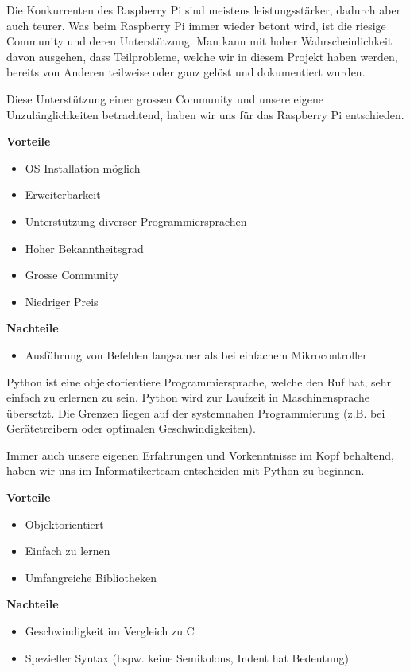 \documentclass[a4paper]{report}
\begin{document}
Die Konkurrenten des Raspberry Pi sind meistens leistungsstärker, dadurch aber auch teurer. Was beim Raspberry Pi immer wieder betont wird, ist die riesige Community und deren Unterstützung. Man kann mit hoher Wahrscheinlichkeit davon ausgehen, dass Teilprobleme, welche wir in diesem Projekt haben werden, bereits von Anderen teilweise oder ganz gelöst und dokumentiert wurden.

Diese Unterstützung einer grossen Community und unsere eigene Unzulänglichkeiten betrachtend, haben wir uns für das Raspberry Pi entschieden.

\begin{multicols}{2}
	\textbf{Vorteile}
	\begin{itemize}[label={+},noitemsep]
		\item OS Installation möglich
		\item Erweiterbarkeit
		\item Unterstützung diverser Programmiersprachen
		\item Hoher Bekanntheitsgrad
		\item Grosse Community
		\item Niedriger Preis
	\end{itemize}
	\columnbreak
	\textbf{Nachteile}
	\begin{itemize}[label={-},noitemsep]
		\item Ausführung von Befehlen langsamer als bei einfachem Mikrocontroller
	\end{itemize}
\end{multicols}

Python ist eine objektorientiere Programmiersprache, welche den Ruf hat, sehr einfach zu erlernen zu sein. Python wird  zur Laufzeit in Maschinensprache übersetzt. Die Grenzen liegen auf der systemnahen Programmierung (z.B. bei
Gerätetreibern oder optimalen Geschwindigkeiten).

Immer auch unsere eigenen Erfahrungen und Vorkenntnisse im Kopf behaltend, haben wir uns im Informatikerteam entscheiden mit Python zu beginnen.

\begin{multicols}{2}
	\textbf{Vorteile}
	\begin{itemize}[label={+},noitemsep]
		\item Objektorientiert
		\item Einfach zu lernen
		\item Umfangreiche Bibliotheken
	\end{itemize}
	\columnbreak
	\textbf{Nachteile}
	\begin{itemize}[label={-},noitemsep]
		\item Geschwindigkeit im Vergleich zu C
		\item Spezieller Syntax (bspw. keine Semikolons, Indent hat Bedeutung)
	\end{itemize}
\end{multicols}
\end{document}

